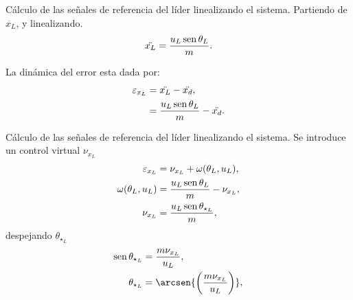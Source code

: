 \documentclass[hyperref={pdfpagelabels=false}]{beamer}
\begin{document}
%		
%		
%		
%		
%	
%		
%		
%		

\begin{frame}{Cálculo de las señales de referencia del l\'ider linealizando el sistema.} 
	Partiendo de $\ddot{x_L}$, y linealizando.
\begin{equation}
	\ddot{x_L} = \frac{u_L \operatorname{sen}{\theta_L}}{m}.
\end{equation}

La dinámica del error esta dada por: 
\begin{equation}
	\begin{split}
		\varepsilon_{x_L} &= \ddot{x_L} - \ddot{x_d},\\
		&= \frac{u_L \operatorname{sen}{\theta_L}}{m} - \ddot{x_d}.
	\end{split}	
\end{equation}
\end{frame}


\begin{frame}{Cálculo de las señales de referencia del l\'ider linealizando el sistema.} 
Se introduce un control virtual $\nu_{x_L}$
	\begin{equation}
		\begin{split}
			\varepsilon_{x_L} &= \nu_{x_L} + \omega(\theta_L,u_L),\\
			\omega(\theta_L,u_L) &= \frac{u_L \operatorname{sen}{\theta_L}}{m} - \nu_{x_L},\\
			\nu_{x_L} &= \frac{u_L \operatorname{sen}{\theta_{\star_L}}}{m},
		\end{split}
	\end{equation}
despejando $\theta_{\star_L}$
\begin{equation}
	\begin{split}
		\sen{\theta_{\star_L}} &= \frac{m \nu_{x_L}}{u_L},\\
		\theta_{\star_L} &= \arcsen{\bigg(\frac{m \nu_{x_L}}{u_L}\bigg)},\\
	\end{split}
\end{equation}
\end{frame}
\end{document}
